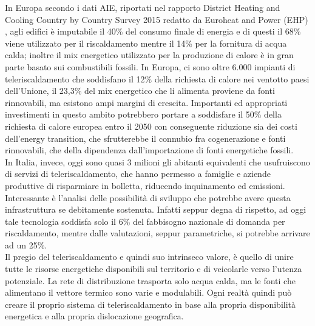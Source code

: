 \documentclass[laurea,oneside,11pt]{USiena_tesiLM3}
\begin{document}
In Europa secondo i dati AIE, riportati nel rapporto District Heating and Cooling Country by Country Survey 2015 redatto da Euroheat and Power (EHP) \cite{heating2015cooling}, agli edifici è imputabile il 40\% del consumo finale di energia e di questi il 68\% viene utilizzato per il riscaldamento mentre il 14\% per la fornitura di acqua calda; inoltre il mix energetico utilizzato per la produzione di calore è in gran parte basato sui combustibili fossili. In Europa, ci sono oltre 6.000 impianti di teleriscaldamento che soddisfano il 12\% della richiesta di calore nei ventotto paesi dell'Unione, il 23,3\% del mix energetico che li alimenta proviene da fonti rinnovabili, ma esistono ampi margini di crescita. Importanti ed appropriati investimenti in questo ambito potrebbero portare a soddisfare il 50\% della richiesta di calore europea entro il 2050 con conseguente riduzione sia dei costi dell'energy transition, che sfrutterebbe il connubio fra cogenerazione e fonti rinnovabili, che della dipendenza dall'importazione di fonti energetiche fossili.\\

In Italia, invece, oggi sono quasi 3 milioni gli abitanti equivalenti che usufruiscono di servizi di teleriscaldamento, che hanno permesso a famiglie e aziende produttive di risparmiare in bolletta, riducendo inquinamento ed emissioni. 
Interessante è l'analisi delle possibilità di sviluppo che potrebbe avere questa infrastruttura se debitamente sostenuta. Infatti seppur degna di rispetto, ad oggi tale tecnologia soddisfa solo il 6\% del fabbisogno nazionale di domanda per riscaldamento, mentre dalle valutazioni, seppur parametriche, si potrebbe arrivare ad un 25\%.\\

 Il pregio del teleriscaldamento e quindi suo intrinseco valore, è quello di unire tutte le risorse energetiche disponibili sul territorio e di veicolarle verso l'utenza potenziale. La rete di distribuzione trasporta solo acqua calda, ma le fonti che alimentano il vettore termico sono varie e modulabili. Ogni realtà quindi può creare il proprio sistema di teleriscaldamento in base alla propria disponibilità energetica e alla propria dislocazione geografica.
\end{document}
